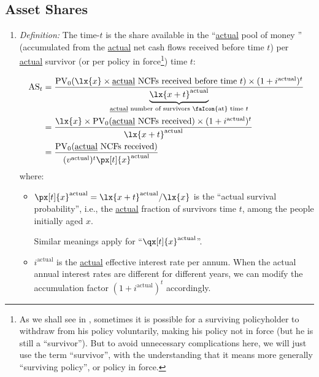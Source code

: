 \subsection{Asset Shares}
\label{subsect:asset-shares}
\begin{enumerate}
\item \emph{Definition:} The time-\(t\)  is the share
 available in the ``\underline{actual} pool of money
'' (accumulated from the \underline{actual} net cash flows
received before time \(t\)) per \underline{actual} survivor (or per policy in
force\footnote{As we shall see in , sometimes it
is possible for a surviving policyholder to withdraw from his policy
voluntarily, making his policy not in force (but he is still a ``survivor'').
But to avoid unnecessary complications here, we will just use the term
``survivor'', with the understanding that it means more generally ``surviving
policy'', or policy in force.})  time \(t\):

\begin{align*}
\as_{t}&=\frac{\pvt{0}{\lx{x}\times \text{\underline{actual} NCFs received before time \(t\)}}\times (1+i^{\mathrm{actual}})^{t}}
{\underbrace{\lx{x+t}^{\mathrm{actual}}}_{\text{\underline{actual} number of survivors \faIcon{at} time \(t\)}}}\\
&=\frac{\lx{x}\times \pvt{0}{\text{\underline{actual} NCFs received}}\times (1+i^{\mathrm{actual}})^{t}}{\lx{x+t}^{\mathrm{actual}}} \\
&=\frac{\pvt{0}{\text{\underline{actual} NCFs received}}}{(v^{\mathrm{actual}})^{t}\px[t]{x}^{\mathrm{actual}}}
\end{align*}
where:
\begin{itemize}
\item \(\px[t]{x}^{\mathrm{actual}}=\lx{x+t}^{\mathrm{actual}}/\lx{x}\) is the
``actual survival probability'', i.e., the \underline{actual} fraction of
survivors  time \(t\), among the people initially aged \(x\). \begin{note}
Similar meanings apply for ``\(\qx[t]{x}^{\mathrm{actual}}\)''.
\end{note}
\item \(i^{\mathrm{actual}}\) is the \underline{actual} effective interest rate
per annum. When the actual annual interest rates are different for different
years, we can modify the accumulation factor \((1+i^{\mathrm{actual}})^{t}\)
accordingly.
\end{itemize}


\end{enumerate}
